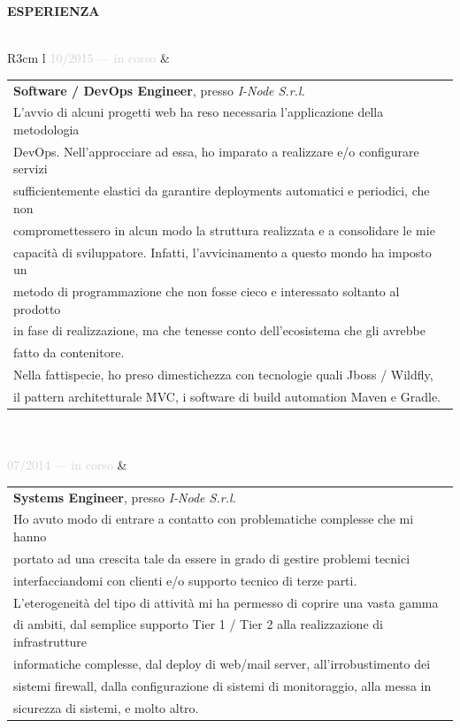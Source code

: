 \documentclass{article}
\begin{document}
\textbf{\textcolor{deepblue}{ESPERIENZA}} \\\\ \hfill
\begin{tabular}{ R{3cm} l }
	\textcolor{lightgray}{10/2015 — in corso} & \begin{tabular}[l]{@{}l@{}}
	\textbf{Software / DevOps Engineer}, presso \textit{I-Node S.r.l.} \\
	L'avvio di alcuni progetti web ha reso necessaria l'applicazione della metodologia \\
	DevOps. Nell'approcciare ad essa, ho imparato a realizzare e/o configurare servizi \\
	sufficientemente elastici da garantire deployments automatici e periodici, che non \\
	compromettessero in alcun modo la struttura realizzata e a consolidare le mie \\
	capacità di sviluppatore. Infatti, l'avvicinamento a questo mondo ha imposto un \\
	metodo di programmazione che non fosse cieco e interessato soltanto al prodotto \\
	in fase di realizzazione, ma che tenesse conto dell'ecosistema che gli avrebbe \\
	fatto da contenitore. \\
	Nella fattispecie, ho preso dimestichezza con tecnologie quali Jboss / Wildfly, \\
	il pattern architetturale MVC, i software di build automation Maven e Gradle.
\end{tabular} \\\\ \hfill
\textcolor{lightgray}{07/2014 — in corso}   & \begin{tabular}[l]{@{}l@{}}
\textbf{Systems Engineer}, presso \textit{I-Node S.r.l.} \\
Ho avuto modo di entrare a contatto con problematiche complesse che mi hanno \\
portato ad una crescita tale da essere in grado di gestire problemi tecnici \\
interfacciandomi con clienti e/o supporto tecnico di terze parti. \\
L'eterogeneità del tipo di attivit\`a mi ha permesso di coprire una vasta gamma \\
di ambiti, dal semplice supporto Tier 1 / Tier 2 alla realizzazione di infrastrutture \\
informatiche complesse, dal deploy di web/mail server, all'irrobustimento dei \\
sistemi firewall, dalla configurazione di sistemi di monitoraggio, alla messa in \\
sicurezza di sistemi, e molto altro.
\end{tabular} \\\\ \hfill
\end{tabular}
\end{document}

